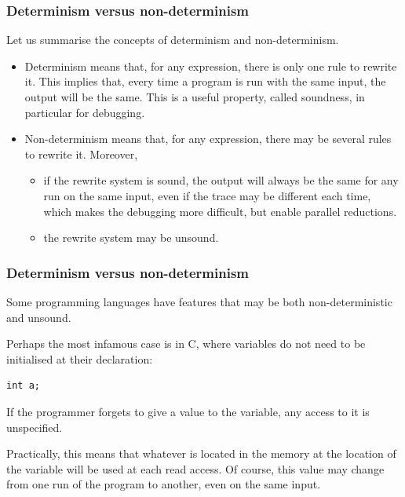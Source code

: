 \documentclass[compress,dvipdfmx]{beamer}
\begin{document}
%
\begin{frame}
  \frametitle{Determinism versus non-determinism}

  Let us summarise the concepts of determinism and
  non\hyp{}determinism.
  \begin{itemize}

    \item Determinism means that, for any expression, there is only
      one rule to rewrite it. This implies that, every time a program
      is run with the same input, the output will be the same. This is
      a useful property, called soundness, in particular for
      debugging.

    \item Non-determinism means that, for any expression, there may be
      several rules to rewrite it. Moreover,
      \begin{itemize}

         \item if the rewrite system is sound, the output will always
           be the same for any run on the same input, even if the
           trace may be different each time, which makes the debugging
           more difficult, but enable parallel reductions.

         \item the rewrite system may be unsound.

      \end{itemize}
  \end{itemize}

\end{frame}


%
\begin{frame}[fragile]
  \frametitle{Determinism versus non-determinism}

  Some programming languages have features that may be both
  non\hyp{}deterministic and unsound.

  \bigskip

  Perhaps the most infamous case is in C, where variables do not need
  to be initialised at their declaration:
{\small
\begin{verbatim}
int a;
\end{verbatim}
}
  If the programmer forgets to give a value to the variable, any access
  to it is unspecified.

  \bigskip

  Practically, this means that whatever is located in the memory at
  the location of the variable will be used at each read access. Of
  course, this value may change from one run of the program to
  another, even on the same input.

\end{frame}
\end{document}
